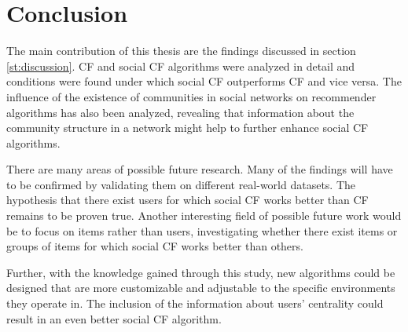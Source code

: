 \chapter{Conclusion}
\label{c:conclusion} The main contribution of this thesis are the findings discussed in section \ref{st:discussion}. CF and social CF algorithms were analyzed in detail and conditions were found under which social CF outperforms CF and vice versa. The influence of the existence of communities in social networks on recommender algorithms has also been analyzed, revealing that information about the community structure in a network might help to further enhance social CF algorithms.
\newline

There are many areas of possible future research. Many of the findings will have to be confirmed by validating them on different real-world datasets. The hypothesis that there exist users for which social CF works better than CF remains to be proven true. Another interesting field of possible future work would be to focus on items rather than users, investigating whether there exist items or groups of items for which social CF works better than others.

Further, with the knowledge gained through this study, new algorithms could be designed that are more customizable and adjustable to the specific environments they operate in. The inclusion of the information about users' centrality could result in an even better social CF algorithm.
